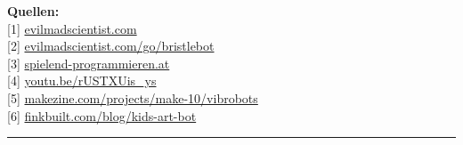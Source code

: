 \documentclass[10pt,a4paper,ngerman,twoside]{article} %
\newcommand{\SepRule}{\noindent	%
\begin{center}
\rule{250pt}{1pt} %
\end{center}
}
\begin{document}
\textbf{Quellen:}\\
{[}1{]} \href{http://www.evilmadscientist.com/about/}{evilmadscientist.com} \\
{[}2{]} \href{http://www.evilmadscientist.com/go/bristlebot}{evilmadscientist.com/go/bristlebot} \\
{[}3{]} \href{http://spielend-programmieren.at}{spielend-programmieren.at} \\
{[}4{]} \href{http://youtu.be/rUSTXUis_ys}{youtu.be/rUSTXUis\_ys} \\
{[}5{]} \href{http://makezine.com/projects/make-10/vibrobots/}{makezine.com/projects/make-10/vibrobots} \\
{[}6{]} \href{http://www.finkbuilt.com/blog/kids-art-bot/}{finkbuilt.com/blog/kids-art-bot} 


\SepRule
\end{document}
